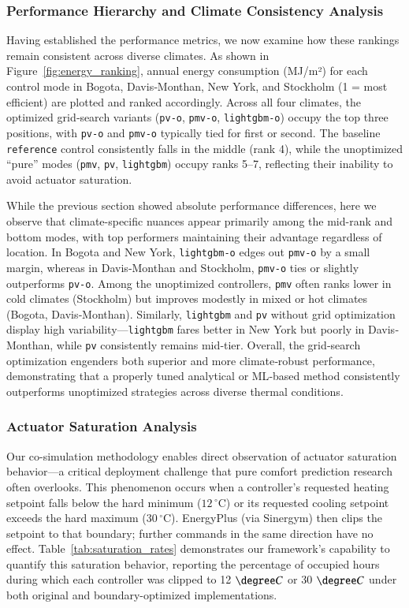 \subsubsection{Performance Hierarchy and Climate Consistency Analysis}
\label{sec:performance_hierarchy}
Having established the performance metrics, we now examine how these rankings remain consistent across diverse climates. 
As shown in Figure~\ref{fig:energy_ranking}, annual energy consumption (MJ/m²) for each control mode in Bogota, Davis‐Monthan, New York, and Stockholm (1 = most efficient) are plotted and ranked accordingly. Across all four climates, the optimized grid‐search variants (\texttt{pv-o}, \texttt{pmv-o}, \texttt{lightgbm-o}) occupy the top three positions, with \texttt{pv-o} and \texttt{pmv-o} typically tied for first or second. The baseline \texttt{reference} control consistently falls in the middle (rank 4), while the unoptimized “pure” modes (\texttt{pmv}, \texttt{pv}, \texttt{lightgbm}) occupy ranks 5–7, reflecting their inability to avoid actuator saturation.

While the previous section showed absolute performance differences, here we observe that climate-specific nuances appear primarily among the mid-rank and bottom modes, with top performers maintaining their advantage regardless of location. In Bogota and New York, \texttt{lightgbm-o} edges out \texttt{pmv-o} by a small margin, whereas in Davis‐Monthan and Stockholm, \texttt{pmv-o} ties or slightly outperforms \texttt{pv-o}. Among the unoptimized controllers, \texttt{pmv} often ranks lower in cold climates (Stockholm) but improves modestly in mixed or hot climates (Bogota, Davis‐Monthan). Similarly, \texttt{lightgbm} and \texttt{pv} without grid optimization display high variability—\texttt{lightgbm} fares better in New York but poorly in Davis‐Monthan, while \texttt{pv} consistently remains mid‐tier. Overall, the grid‐search optimization engenders both superior and more climate‐robust performance, demonstrating that a properly tuned analytical or ML‐based method consistently outperforms unoptimized strategies across diverse thermal conditions.


\subsubsection{Actuator Saturation Analysis}
\label{sec:actuator_saturation_results}
Our co-simulation methodology enables direct observation of actuator saturation behavior—a critical deployment challenge that pure comfort prediction research often overlooks. This phenomenon occurs when a controller's requested heating setpoint falls below the hard minimum ($12\,^\circ\mathrm{C}$) or its requested cooling setpoint exceeds the hard maximum ($30\,^\circ\mathrm{C}$). 
EnergyPlus (via Sinergym) then clips the setpoint to that boundary; further commands in the same direction have no effect. Table~\ref{tab:saturation_rates} demonstrates our framework's capability to quantify this saturation behavior, reporting the percentage of occupied hours during which each controller was clipped to 12 $\degree C$ or 30 $\degree C$ under both original and boundary-optimized implementations.

